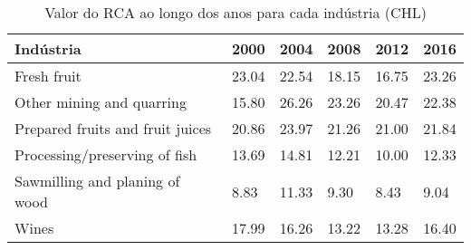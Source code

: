 \begin{table}
\centering
\caption{Valor do RCA ao longo dos anos para cada indústria (CHL)}
\label{tab:ex3-tempo-CHL}
\begin{tabular}{p{6cm}p{1.5cm}p{1.5cm}p{1.5cm}p{1.5cm}p{1.5cm}}
\toprule
                       Indústria &  2000 &  2004 &  2008 &  2012 &  2016 \\
\midrule
                     Fresh fruit & 23.04 & 22.54 & 18.15 & 16.75 & 23.26 \\
       Other mining and quarring & 15.80 & 26.26 & 23.26 & 20.47 & 22.38 \\
Prepared fruits and fruit juices & 20.86 & 23.97 & 21.26 & 21.00 & 21.84 \\
   Processing/preserving of fish & 13.69 & 14.81 & 12.21 & 10.00 & 12.33 \\
  Sawmilling and planing of wood &  8.83 & 11.33 &  9.30 &  8.43 &  9.04 \\
                           Wines & 17.99 & 16.26 & 13.22 & 13.28 & 16.40 \\
\bottomrule
\end{tabular}
\end{table}
